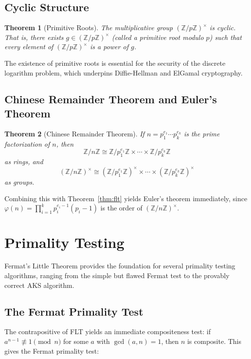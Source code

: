 \documentclass{amsart}
\theoremstyle{plain}
\newtheorem{theorem}{Theorem}[section]
\theoremstyle{definition}
\theoremstyle{remark}
\newcommand{\Z}{\mathbb{Z}}
\begin{document}
\subsection{Cyclic Structure}

\begin{theorem}[Primitive Roots]\label{thm:primitive}
The multiplicative group $(\Z/p\Z)^\times$ is cyclic. That is, there exists $g \in (\Z/p\Z)^\times$ (called a primitive root modulo $p$) such that every element of $(\Z/p\Z)^\times$ is a power of $g$.
\end{theorem}

The existence of primitive roots is essential for the security of the discrete logarithm problem, which underpins Diffie-Hellman and ElGamal cryptography.

\subsection{Chinese Remainder Theorem and Euler's Theorem}

\begin{theorem}[Chinese Remainder Theorem]\label{thm:crt}
If $n = p_1^{e_1} \cdots p_k^{e_k}$ is the prime factorization of $n$, then
\[
\Z/n\Z \cong \Z/p_1^{e_1}\Z \times \cdots \times \Z/p_k^{e_k}\Z
\]
as rings, and
\[
(\Z/n\Z)^\times \cong (\Z/p_1^{e_1}\Z)^\times \times \cdots \times (\Z/p_k^{e_k}\Z)^\times
\]
as groups.
\end{theorem}

Combining this with Theorem~\ref{thm:flt} yields Euler's theorem immediately, since $\varphi(n) = \prod_{i=1}^k p_i^{e_i-1}(p_i - 1)$ is the order of $(\Z/n\Z)^\times$.

\section{Primality Testing}\label{sec:primality}

Fermat's Little Theorem provides the foundation for several primality testing algorithms, ranging from the simple but flawed Fermat test to the provably correct AKS algorithm.

\subsection{The Fermat Primality Test}

The contrapositive of FLT yields an immediate compositeness test: if $a^{n-1} \not\equiv 1 \pmod{n}$ for some $a$ with $\gcd(a,n) = 1$, then $n$ is composite. This gives the Fermat primality test:
\end{document}
